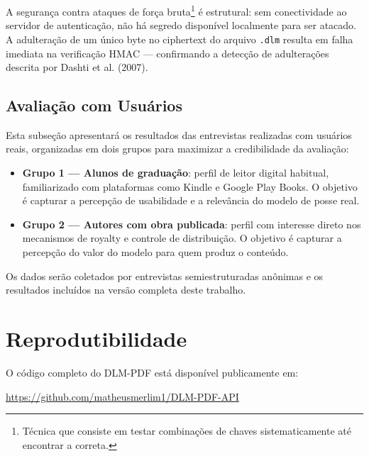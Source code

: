 \documentclass[12pt]{article}
\begin{document}
A segurança contra ataques de força bruta\footnote{Técnica que consiste em testar combinações de chaves sistematicamente até encontrar a correta.} é estrutural: sem conectividade ao servidor de autenticação, não há segredo disponível localmente para ser atacado. A adulteração de um único byte no ciphertext do arquivo \texttt{.dlm} resulta em falha imediata na verificação HMAC — confirmando a detecção de adulterações descrita por Dashti et al. (2007).

\subsection{Avaliação com Usuários}


Esta subseção apresentará os resultados das entrevistas realizadas com usuários reais,
organizadas em dois grupos para maximizar a credibilidade da avaliação:

\begin{itemize}
    \item \textbf{Grupo 1 — Alunos de graduação}: perfil de leitor digital habitual, familiarizado com plataformas como Kindle e Google Play Books. O objetivo é capturar a percepção de usabilidade e a relevância do modelo de posse real.
    \item \textbf{Grupo 2 — Autores com obra publicada}: perfil com interesse direto nos mecanismos de royalty e controle de distribuição. O objetivo é capturar a percepção do valor do modelo para quem produz o conteúdo.
\end{itemize}

Os dados serão coletados por entrevistas semiestruturadas anônimas e os resultados incluídos na versão completa deste trabalho.

\section{Reprodutibilidade}

O código completo do DLM-PDF está disponível publicamente em:

\begin{center}
\url{https://github.com/matheusmerlim1/DLM-PDF-API}
\end{center}
\end{document}
